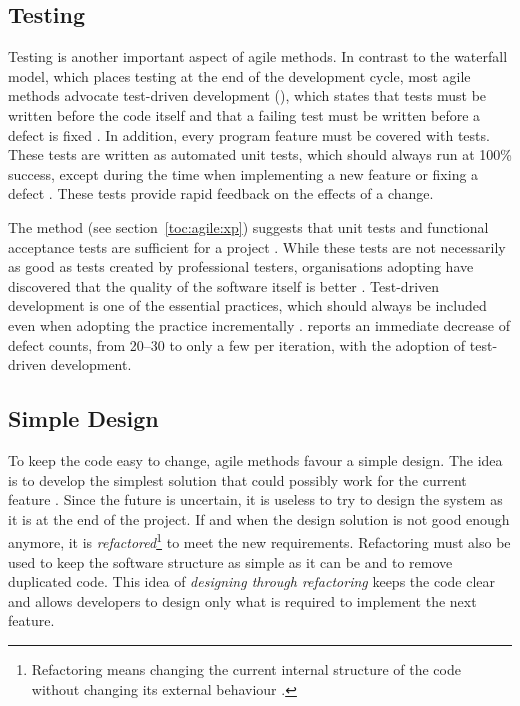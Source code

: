 \subsection{Testing}
\label{toc:agile:overview:testing}

Testing is another important aspect of agile methods. In contrast to 
the waterfall model, which places testing at the end of the 
development cycle, most agile methods advocate test-driven development 
(), which states that tests must be written before the 
code itself \citep{xpexplained} and that a failing test must be 
written before a defect is fixed \citep{questioningxp}. In addition, 
every program feature must be covered with tests. These tests are 
written as automated unit tests, which should always run at 100\% 
success, except during the time when implementing a new feature or 
fixing a defect \citep{xpexplained}. These tests provide rapid 
feedback on the effects of a change.

The  method (see section~\ref{toc:agile:xp}) suggests that 
unit tests and functional acceptance tests are sufficient for a 
project \citep{xpexplained}. While these tests are not necessarily as 
good as tests created by professional testers, organisations adopting 
 have discovered that the quality of the software itself is 
better \citep{questioningxp}. Test-driven development is one of the 
essential  practices, which should always be included even 
when adopting the practice incrementally \citep{xpapplied}. 
\cite{agileadoption} reports an immediate decrease of defect counts, 
from 20--30 to only a few per iteration, with the adoption of 
test-driven development.


\subsection{Simple Design}
\label{toc:agile:overview:design}

To keep the code easy to change, agile methods favour a simple design. 
The idea is to develop the simplest solution that could possibly work 
for the current feature \citep{xpexplained}. Since the future is 
uncertain, it is useless to try to design the system as it is at the 
end of the project. If and when the design solution is not good enough 
anymore, it is \textsl{refactored}\footnote{Refactoring means changing 
the current internal structure of the code without changing its 
external behaviour \citep{xpapplied}.} to meet the new requirements. 
Refactoring must also be used to keep the software structure as simple 
as it can be and to remove duplicated code. This idea of 
\textsl{designing through refactoring} keeps the code clear and allows 
developers to design only what is required to implement the next 
feature. \citep{xpexplained}

